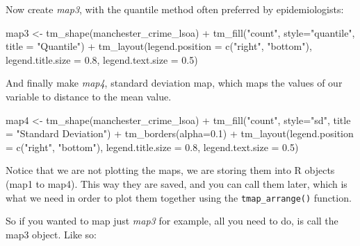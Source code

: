 \documentclass[
]{book}
\newenvironment{Shaded}{\begin{snugshade}}{\end{snugshade}}
\newcommand{\AttributeTok}[1]{\textcolor[rgb]{0.77,0.63,0.00}{#1}}
\newcommand{\FloatTok}[1]{\textcolor[rgb]{0.00,0.00,0.81}{#1}}
\newcommand{\FunctionTok}[1]{\textcolor[rgb]{0.00,0.00,0.00}{#1}}
\newcommand{\NormalTok}[1]{#1}
\newcommand{\OtherTok}[1]{\textcolor[rgb]{0.56,0.35,0.01}{#1}}
\newcommand{\SpecialCharTok}[1]{\textcolor[rgb]{0.00,0.00,0.00}{#1}}
\newcommand{\StringTok}[1]{\textcolor[rgb]{0.31,0.60,0.02}{#1}}
\begin{document}
Now create \emph{map3}, with the quantile method often preferred by epidemiologists:

\begin{Shaded}
\begin{Highlighting}[]
\NormalTok{map3 }\OtherTok{\textless{}{-}} \FunctionTok{tm\_shape}\NormalTok{(manchester\_crime\_lsoa) }\SpecialCharTok{+} 
  \FunctionTok{tm\_fill}\NormalTok{(}\StringTok{"count"}\NormalTok{, }\AttributeTok{style=}\StringTok{"quantile"}\NormalTok{, }\AttributeTok{title =} \StringTok{"Quantile"}\NormalTok{) }\SpecialCharTok{+}
  \FunctionTok{tm\_layout}\NormalTok{(}\AttributeTok{legend.position =} \FunctionTok{c}\NormalTok{(}\StringTok{"right"}\NormalTok{, }\StringTok{"bottom"}\NormalTok{), }
            \AttributeTok{legend.title.size =} \FloatTok{0.8}\NormalTok{,}
            \AttributeTok{legend.text.size =} \FloatTok{0.5}\NormalTok{)}
\end{Highlighting}
\end{Shaded}

And finally make \emph{map4}, standard deviation map, which maps the values of our variable to distance to the mean value.

\begin{Shaded}
\begin{Highlighting}[]
\NormalTok{map4 }\OtherTok{\textless{}{-}} \FunctionTok{tm\_shape}\NormalTok{(manchester\_crime\_lsoa) }\SpecialCharTok{+} 
  \FunctionTok{tm\_fill}\NormalTok{(}\StringTok{"count"}\NormalTok{, }\AttributeTok{style=}\StringTok{"sd"}\NormalTok{, }\AttributeTok{title =} \StringTok{"Standard Deviation"}\NormalTok{) }\SpecialCharTok{+}
  \FunctionTok{tm\_borders}\NormalTok{(}\AttributeTok{alpha=}\FloatTok{0.1}\NormalTok{) }\SpecialCharTok{+}
  \FunctionTok{tm\_layout}\NormalTok{(}\AttributeTok{legend.position =} \FunctionTok{c}\NormalTok{(}\StringTok{"right"}\NormalTok{, }\StringTok{"bottom"}\NormalTok{), }
            \AttributeTok{legend.title.size =} \FloatTok{0.8}\NormalTok{,}
            \AttributeTok{legend.text.size =} \FloatTok{0.5}\NormalTok{)}
\end{Highlighting}
\end{Shaded}

Notice that we are not plotting the maps, we are storing them into R objects (map1 to map4). This way they are saved, and you can call them later, which is what we need in order to plot them together using the \texttt{tmap\_arrange()} function.

So if you wanted to map just \emph{map3} for example, all you need to do, is call the map3 object. Like so:
\end{document}
